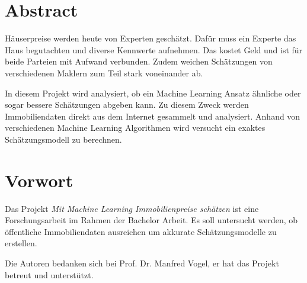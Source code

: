 \section*{Abstract}
Häuserpreise werden heute von Experten geschätzt. Dafür muss ein Experte das Haus begutachten und diverse Kennwerte aufnehmen. Das kostet Geld und ist für beide Parteien mit Aufwand verbunden. Zudem weichen Schätzungen von verschiedenen Maklern zum Teil stark voneinander ab.

In diesem Projekt wird analysiert, ob ein Machine Learning Ansatz ähnliche oder sogar bessere Schätzungen abgeben kann. Zu diesem Zweck werden Immobiliendaten direkt aus dem Internet gesammelt und analysiert. Anhand von verschiedenen Machine Learning Algorithmen wird versucht ein exaktes Schätzungsmodell zu berechnen.

\section*{Vorwort}
Das Projekt \emph{Mit Machine Learning Immobilienpreise schätzen} ist eine Forschungsarbeit im Rahmen der Bachelor Arbeit. Es soll untersucht werden, ob öffentliche Immobiliendaten ausreichen um akkurate Schätzungsmodelle zu erstellen.

Die Autoren bedanken sich bei Prof. Dr. Manfred Vogel, er hat das Projekt betreut und unterstützt.


